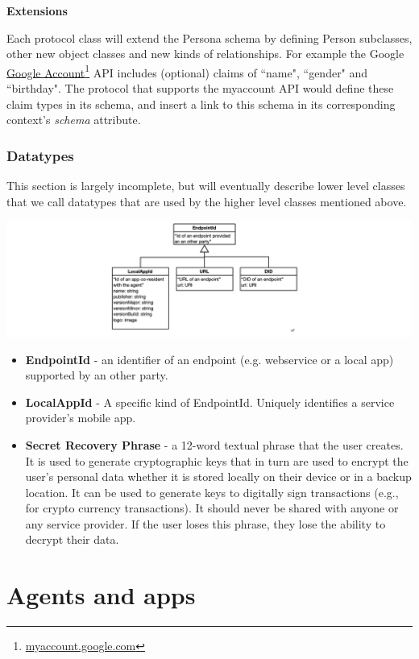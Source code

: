 \documentclass[11pt, oneside]{article}   	%
\newcommand{\hyperfootnote}[1][]{\def\ArgI{{#1}}\hyperfootnoteRelay}
\newcommand\hyperfootnoteRelay[2][]{\href{#1#2}{\ArgI}\footnote{\href{#1#2}{#2}}}
\begin{document}
\textbf{Extensions}

Each protocol class will extend the Persona schema by defining Person subclasses, other new object classes and new kinds of relationships. For example the Google
\hyperfootnote[Google Account][https://]{myaccount.google.com}  API includes (optional) claims of ``name", ``gender" and ``birthday". The protocol that supports the myaccount API would define these claim types in its schema, and insert a link to this schema in its corresponding context's \emph{schema} attribute.

\subsubsection{Datatypes}

This section is largely incomplete, but will eventually describe lower level classes that we call datatypes that are used by the higher level classes mentioned above.

\includegraphics[width=\textwidth]{./images/datatypes.png}

\begin{itemize}
\item \textbf{EndpointId} -  an identifier of an endpoint (e.g. webservice or a local app) supported by an other party.
\item \textbf{LocalAppId} - A specific kind of EndpointId. Uniquely identifies a service provider's mobile app. 
\item \textbf{Secret Recovery Phrase} - a 12-word textual phrase that the user creates. It is used to generate cryptographic keys that in turn are used to encrypt the user’s personal data whether it is stored locally on their device or in a backup location. It can be used to generate keys to digitally sign transactions (e.g., for crypto currency transactions). It should never be shared with anyone or any service provider. If the user loses this phrase, they lose the ability to decrypt their data. 
\end{itemize}

\section{Agents and apps} %
\end{document}
